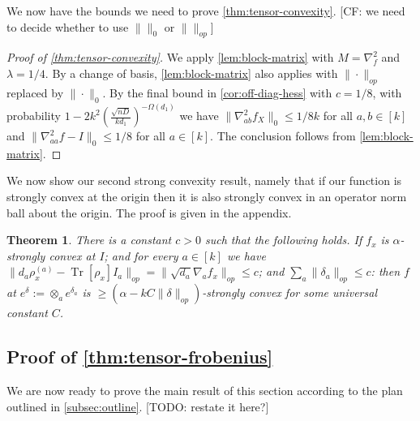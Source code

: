 \documentclass[aos]{imsart}
\newtheorem{theorem}{Theorem}
\theoremstyle{definition}
\DeclareMathOperator{\tr}{Tr}
\newcommand{\samp}{x}
\newcommand{\rv}{X}
\newcommand{\CF}[1]{{\color{purple}[CF: #1]}}
\newcommand{\TODO}[1]{{\color{blue}[TODO: #1]}}
\begin{document}
We now have the bounds we need to prove \cref{thm:tensor-convexity}. \CF{we need to decide whether to use $\|\|_0$ or $\| \|_{op}$}


\begin{proof}[Proof of \cref{thm:tensor-convexity}] We apply \cref{lem:block-matrix} with $M = \nabla^2_f$ and $\lambda = 1/4$. By a change of basis, \cref{lem:block-matrix} also applies with $\| \cdot \|_{op}$ replaced by $\|\cdot \|_0$. By the final bound in \cref{cor:off-diag-hess} with $c = 1/8$, with probability $1 - 2k^2 \left(\frac {\sqrt{nD}}{kd_1}\right)^{ - \Omega(d_1)}$ we have $\|\nabla^2_{ab} f_{\rv}\|_0 \leq 1/8k$ for all $a,b \in [k]$ and $\|\nabla^2_{aa}f - I\|_0 \leq 1/8$ for all $a \in [k]$. The conclusion follows from \cref{lem:block-matrix}.\end{proof}





We now show our second strong convexity result, namely that if our function is strongly convex at the origin then it is also strongly convex in an operator norm ball about the origin. The proof is given in the appendix.


\begin{theorem} \label{convexRobustness}
There is a constant $c>0$ such that the following holds. If $f_{\samp}$ is $\alpha$-strongly convex at $I$; and for every $a \in [k]$ we have $\|d_{a} \rho_{\samp}^{(a)} - \tr[\rho_{\samp}] I_{a}\|_{op} = \|\sqrt{d_{a}} \nabla_{a} f_{\samp}\|_{op} \leq c$; and $\sum_{a} \|\delta_{a}\|_{op} \leq c$: then $f$ at $e^{\delta} := \otimes_{a} e^{\delta_{a}}$ is $\geq (\alpha - k C \|\delta\|_{op})$-strongly convex for some universal constant $C$.
\end{theorem}

\subsection{Proof of \cref{thm:tensor-frobenius}}
We are now ready to prove the main result of this section according to the plan outlined in \cref{subsec:outline}.
\TODO{restate it here?}
\end{document}
